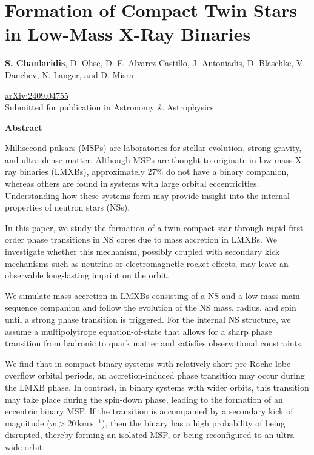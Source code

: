 \documentclass[main.tex]{subfiles}
\begin{document}
    \chapter[Formation of Compact Twin Stars in Low-Mass X-Ray Binaries]{Formation of Compact Twin Stars in Low-Mass X-Ray Binaries}


    \begin{center}
        \textbf{S. Chanlaridis}, D. Ohse, D. E. Alvarez-Castillo, J. Antoniadis, D. Blaschke, V. Danchev, N. Langer, and D. Misra   \\

        \vspace{0.5cm}

        \href{https://arxiv.org/abs/2409.04755}{arXiv:2409.04755} \\
        Submitted for publication in Astronomy \& Astrophysics
    \end{center}
        
        
    \begin{center}
        \textbf{\large Abstract}
    \end{center}

    Millisecond pulsars (MSPs) are laboratories for stellar evolution, strong gravity, and ultra-dense matter. Although MSPs are thought to originate in low-mass X-ray binaries (LMXBs), approximately 27\% do not have a binary companion, whereas others are found in systems with large orbital eccentricities. Understanding how these systems form may provide insight into the internal properties of neutron stars (NSs).

    In this paper, we study the formation of a twin compact star through  rapid first-order phase transitions in NS cores due to mass accretion in LMXBs. We investigate whether this mechanism, possibly coupled with secondary kick mechanisms such as neutrino or electromagnetic rocket effects, may leave an observable long-lasting imprint on the orbit.

    We simulate mass accretion in LMXBs consisting of a NS and a low mass main sequence companion and follow the evolution of the NS mass, radius, and spin until a strong phase transition is triggered. For the internal NS structure, we assume a multipolytrope equation-of-state  that allows for a sharp phase transition from hadronic to quark matter and satisfies observational constraints.

    We find that in compact binary systems with relatively short pre-Roche lobe overflow orbital periods, an accretion-induced phase transition may occur during the LMXB phase. In contrast, in binary systems with wider orbits, this transition may take place during the spin-down phase, leading to the formation of an eccentric binary MSP. If the transition is accompanied by a secondary kick of magnitude ($w > 20$\,km\,s$^{-1}$), then the binary has a high probability of being disrupted, thereby forming an isolated MSP, or being reconfigured to an ultra-wide orbit.
\end{document}
